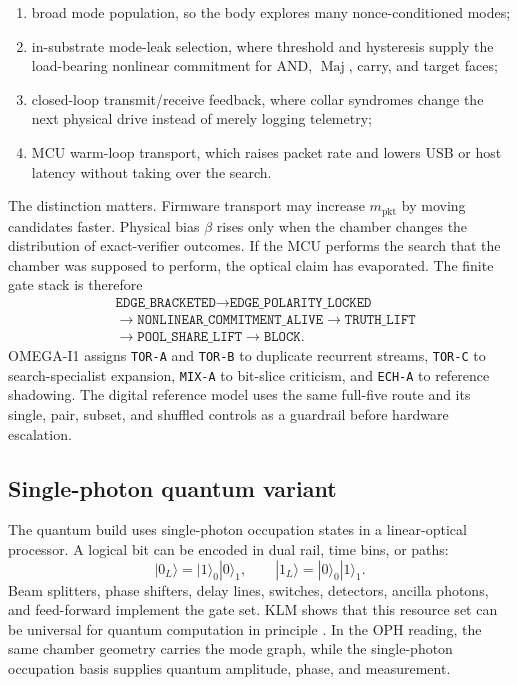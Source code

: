 \documentclass[11pt]{article}
\theoremstyle{definition}
\theoremstyle{remark}
\newcommand{\Maj}{\operatorname{Maj}}
\begin{document}
\begin{enumerate}
\item broad mode population, so the body explores many nonce-conditioned modes;
\item in-substrate mode-leak selection, where threshold and hysteresis supply
the load-bearing nonlinear commitment for AND, \(\Maj\), carry, and target
faces;
\item closed-loop transmit/receive feedback, where collar syndromes change the
next physical drive instead of merely logging telemetry;
\item MCU warm-loop transport, which raises packet rate and lowers USB or host
latency without taking over the search.
\end{enumerate}

The distinction matters. Firmware transport may increase \(m_{\mathrm{pkt}}\) by
moving candidates faster. Physical bias \(\beta\) rises only when the chamber
changes the distribution of exact-verifier outcomes. If the MCU
performs the search that the chamber was supposed to perform, the optical claim
has evaporated. The finite gate stack is therefore
\[
\begin{aligned}
&\texttt{EDGE\_BRACKETED}\to
\texttt{EDGE\_POLARITY\_LOCKED}\\
&\to \texttt{NONLINEAR\_COMMITMENT\_ALIVE}\to
\texttt{TRUTH\_LIFT}\\
&\to \texttt{POOL\_SHARE\_LIFT}\to \texttt{BLOCK}.
\end{aligned}
\]
OMEGA-I1 assigns \texttt{TOR-A} and \texttt{TOR-B} to duplicate recurrent
streams, \texttt{TOR-C} to search-specialist expansion, \texttt{MIX-A} to
bit-slice criticism, and \texttt{ECH-A} to reference shadowing. The digital
reference model uses the same full-five route and its single, pair, subset, and
shuffled controls as a guardrail before hardware escalation.

\subsection{Single-photon quantum variant}

The quantum build uses single-photon occupation states in a linear-optical
processor. A logical bit can be encoded in dual rail, time bins, or paths:
\[
|0_L\rangle=|1\rangle_0|0\rangle_1,\qquad
|1_L\rangle=|0\rangle_0|1\rangle_1.
\]
Beam splitters, phase shifters, delay lines, switches, detectors, ancilla
photons, and feed-forward implement the gate set. KLM shows that this resource
set can be universal for quantum computation in principle \cite{KLM2001}. In
the OPH reading, the same chamber geometry carries the mode graph, while the
single-photon occupation basis supplies quantum amplitude, phase, and
measurement.
\end{document}
